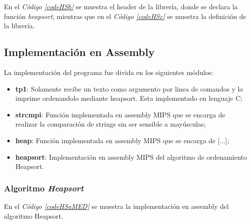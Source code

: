\documentclass{article}
\newcommand{\refcode}[1]{\textit{Código \ref{#1}}}
\begin{document}
	En el \refcode{codeHSh} se muestra el header de la librería, donde se declara la función \textit{heapsort}, mientras que en el \refcode{codeHSc} se muestra la definición de la librería.

\lstset{ language = C } %
 
\bigskip


\lstset{ language = C } %
 
\bigskip\bigskip



\subsection{Implementación en Assembly}

	La implementación del programa fue divida en los siguientes módulos:
	\medskip

\begin{itemize}

\itemsep=2pt \topsep=0pt \partopsep=0pt \parskip=0pt \parsep=0pt
	\item \textbf{tp1}: Solamente recibe un texto como argumento por linea de comandos y lo imprime ordenandolo mediante heapsort. Esta implementado en  lenguaje C;
	\item \textbf{strcmpi}: Función implementada en assembly MIPS que se encarga de realizar la comparación de strings sin ser sensible a mayúsculas;
	\item \textbf{heap}: Función implementada en assembly MIPS que se encarga de [...];
	\item \textbf{heapsort}: Implementación en assembly MIPS del algoritmo de ordenamiento Heapsort.

\end{itemize}	
\medskip




\subsubsection{Algoritmo \textit{Heapsort}}

	En el \refcode{codeHSaMED} se muestra la implementación en assembly del algoritmo Heapsort.

\lstset{ language = [mips]Assembler} %
 
\bigskip\bigskip\medskip
\end{document}
